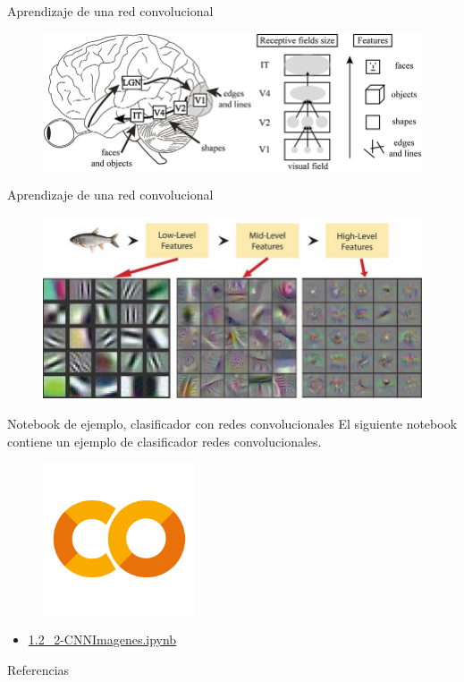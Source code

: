 \begin{frame}{Aprendizaje de una red convolucional}
\begin{figure}
    \centering
    \includegraphics[width=\textwidth]{figures/Tema 3/Cortex.jpg}
    \caption{\cite{Cortex}}
\end{figure}
\end{frame}

\begin{frame}{Aprendizaje de una red convolucional}
\begin{figure}
    \centering
    \includegraphics[width=\textwidth]{figures/Tema 3/ConvHierarchy.png}
    \caption{\cite{siddiqui2018automatic}}
\end{figure}
\end{frame}

\begin{frame}{Notebook de ejemplo, clasificador con redes convolucionales}
El siguiente notebook contiene un ejemplo de clasificador redes convolucionales.

\begin{figure}
    \centering
    \includegraphics[width=0.4\textwidth]{figures/GoogleColab.png}
\end{figure}
\begin{itemize}
    \centering
    \item {\Large \href{https://colab.research.google.com/drive/19TfnBBgbAEDG4YC7EGwcJ6ETZi-xfAiL?usp=sharing}{1.2\_2-CNNImagenes.ipynb}}
\end{itemize}
\end{frame}


\begin{frame}[allowframebreaks]{Referencias}
    
    
\end{frame}

